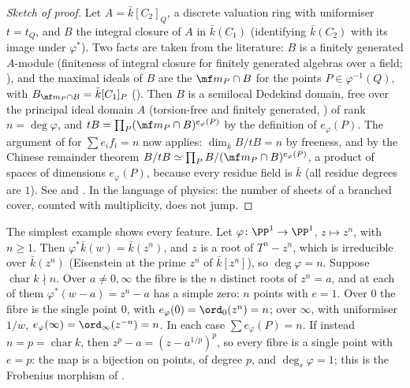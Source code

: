 \begin{proof}[Sketch of proof]
Let $A=\bar k[C_2]_Q$, a discrete valuation ring with uniformiser $t=t_Q$, and $B$ the integral closure of $A$ in $\bar k(C_1)$ (identifying $\bar k(C_2)$ with its
image under $\varphi^*$). Two facts are taken from the literature: $B$ is a finitely generated $A$-module (finiteness of integral closure for finitely generated
algebras over a field; \cite[Chapter 5]{AtiyahMacdonald}), and the maximal ideals of $B$ are the $\mf m_P\cap B$ for the points $P\in\varphi^{-1}(Q)$, with $B_{\mf m_P\cap B}=\bar k[C_1]_P$
(). Then $B$ is a semilocal Dedekind domain, free over the principal ideal domain $A$ (torsion-free and finitely generated,
) of rank $n=\deg\varphi$, and $tB=\prod_P(\mf m_P\cap B)^{e_\varphi(P)}$ by the definition of $e_\varphi(P)$. The argument of  for $\sum e_if_i=n$
now applies: $\dim_{\bar k}B/tB=n$ by freeness, and by the Chinese remainder theorem $B/tB\simeq\prod_PB/(\mf m_P\cap B)^{e_\varphi(P)}$, a product of spaces of
dimensions $e_\varphi(P)$, because every residue field is $\bar k$ (all residue degrees are $1$). See \cite[Chapter II, Proposition 2.6]{SilvermanAEC} and
\cite[Chapter II, Proposition 6.9]{Hartshorne}. In the language of physics: the number of sheets of a branched cover, counted with multiplicity, does not jump.
\end{proof}

The simplest example shows every feature. Let $\varphi\colon\PP^1\to\PP^1$, $z\mapsto z^n$, with $n\ge1$. Then $\varphi^*\bar k(w)=\bar k(z^n)$, and $z$ is a root of
$T^n-z^n$, which is irreducible over $\bar k(z^n)$ (Eisenstein at the prime $z^n$ of $\bar k[z^n]$), so $\deg\varphi=n$. Suppose $\operatorname{char}k\nmid n$. Over
$a\ne0,\infty$ the fibre is the $n$ distinct roots of $z^n=a$, and at each of them $\varphi^*(w-a)=z^n-a$ has a simple zero: $n$ points with $e=1$. Over $0$ the
fibre is the single point $0$, with $e_\varphi(0)=\ord_0(z^n)=n$; over $\infty$, with uniformiser $1/w$, $e_\varphi(\infty)=\ord_\infty(z^{-n})=n$. In each case
$\sum e_\varphi(P)=n$. If instead $n=p=\operatorname{char}k$, then $z^p-a=(z-a^{1/p})^p$, so every fibre is a single point with $e=p$: the map is a bijection on
points, of degree $p$, and $\deg_s\varphi=1$; this is the Frobenius morphism of .

